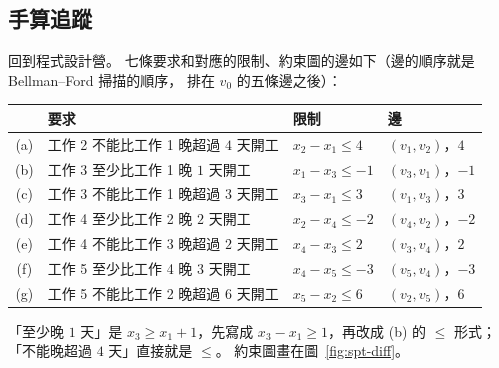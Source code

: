 \subsection{手算追蹤}
\label{sec:spt-diff-trace}

回到程式設計營。 七條要求和對應的限制、約束圖的邊如下（邊的順序就是 Bellman--Ford 掃描的順序，
排在 $v_0$ 的五條邊之後）：

\begin{center}
\small
\begin{tabular}{clll}
\toprule
 & 要求 & 限制 & 邊 \\
\midrule
(a) & 工作 2 不能比工作 1 晚超過 $4$ 天開工 & $x_2 - x_1 \le 4$ & $(v_1, v_2)$，$4$ \\
(b) & 工作 3 至少比工作 1 晚 $1$ 天開工 & $x_1 - x_3 \le -1$ & $(v_3, v_1)$，$-1$ \\
(c) & 工作 3 不能比工作 1 晚超過 $3$ 天開工 & $x_3 - x_1 \le 3$ & $(v_1, v_3)$，$3$ \\
(d) & 工作 4 至少比工作 2 晚 $2$ 天開工 & $x_2 - x_4 \le -2$ & $(v_4, v_2)$，$-2$ \\
(e) & 工作 4 不能比工作 3 晚超過 $2$ 天開工 & $x_4 - x_3 \le 2$ & $(v_3, v_4)$，$2$ \\
(f) & 工作 5 至少比工作 4 晚 $3$ 天開工 & $x_4 - x_5 \le -3$ & $(v_5, v_4)$，$-3$ \\
(g) & 工作 5 不能比工作 2 晚超過 $6$ 天開工 & $x_5 - x_2 \le 6$ & $(v_2, v_5)$，$6$ \\
\bottomrule
\end{tabular}
\end{center}

「至少晚 $1$ 天」是 $x_3 \ge x_1 + 1$，先寫成 $x_3 - x_1 \ge 1$，再改成 (b) 的 $\le$ 形式；
「不能晚超過 $4$ 天」直接就是 $\le$。 約束圖畫在圖~\ref{fig:spt-diff}。

